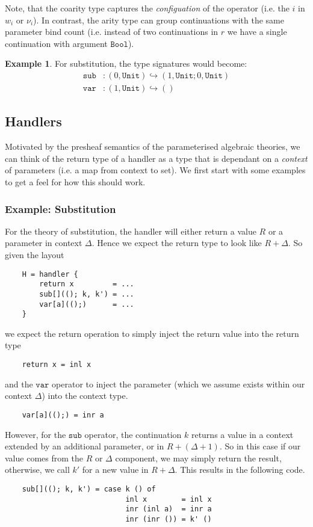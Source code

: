 \documentclass{scrartcl}
\theoremstyle{definition}
\newtheorem{example}[theorem]{Example}
\newcommand{\Unit}{\mathtt{Unit}}
\newcommand{\Bool}{\mathtt{Bool}}
\newcommand{\sub}{\mathtt{sub}}
\newcommand{\var}{\mathtt{var}}
\begin{document}
Note, that the coarity type captures the \emph{configuation} of the operator (i.e. the $i$ in $w_i$ or $\nu_i$). In contrast, the arity type can group continuations with the same parameter bind count (i.e. instead of two continuations in $r$ we have a single continuation with argument $\Bool$).

\begin{example}
For substitution, the type signatures would become:
\begin{align*}
    \sub &: (0, \Unit) \hookrightarrow (1, \Unit; 0, \Unit) \\
    \var &: (1, \Unit) \hookrightarrow ()
\end{align*}
\end{example}

\subsection{Handlers}

Motivated by the presheaf semantics of the parameterised algebraic theories, we can think of the return type of a handler as a type that is dependant on a \emph{context} of parameters (i.e. a map from context to set). We first start with some examples to get a feel for how this should work.

\subsubsection{Example: Substitution}

For the theory of substitution, the handler will either return a value $R$ or a parameter in context $\Delta$. Hence we expect the return type to look like $R+\Delta$. So given the layout
\begin{lstlisting}
    H = handler {
        return x         = ...
        sub[]((); k, k') = ...
        var[a](();)      = ...
    }
\end{lstlisting}
we expect the return operation to simply inject the return value into the return type
\begin{lstlisting}
    return x = inl x
\end{lstlisting}
and the $\var$ operator to inject the parameter (which we assume exists within our context $\Delta$) into the context type.
\begin{lstlisting}
    var[a](();) = inr a
\end{lstlisting}
However, for the $\sub$ operator, the continuation $k$ returns a value in a context extended by an additional parameter, or in $R + (\Delta + 1)$. So in this case if our value comes from the $R$ or $\Delta$ component, we may simply return the result, otherwise, we call $k'$ for a new value in $R+\Delta$. This results in the following code.
\begin{lstlisting}
    sub[]((); k, k') = case k () of
                            inl x        = inl x
                            inr (inl a)  = inr a
                            inr (inr ()) = k' ()
\end{lstlisting}
\end{document}
